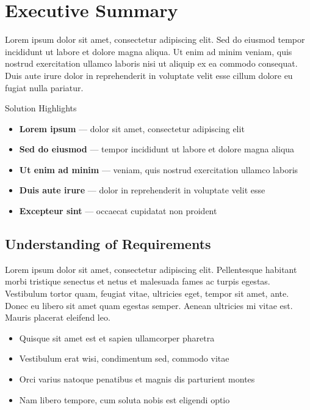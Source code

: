 \section{\texorpdfstring{\color{MidnightBlue}Executive Summary}{Executive Summary}}

Lorem ipsum dolor sit amet, consectetur adipiscing elit. Sed do eiusmod tempor incididunt ut labore et dolore magna aliqua. Ut enim ad minim veniam, quis nostrud exercitation ullamco laboris nisi ut aliquip ex ea commodo consequat. Duis aute irure dolor in reprehenderit in voluptate velit esse cillum dolore eu fugiat nulla pariatur.

\begin{sidebar}{Solution Highlights}
\begin{itemize}
    \item \textbf{Lorem ipsum} --- dolor sit amet, consectetur adipiscing elit
    \item \textbf{Sed do eiusmod} --- tempor incididunt ut labore et dolore magna aliqua
    \item \textbf{Ut enim ad minim} --- veniam, quis nostrud exercitation ullamco laboris
    \item \textbf{Duis aute irure} --- dolor in reprehenderit in voluptate velit esse
    \item \textbf{Excepteur sint} --- occaecat cupidatat non proident
\end{itemize}
\end{sidebar}

\subsection{Understanding of Requirements}

Lorem ipsum dolor sit amet, consectetur adipiscing elit. Pellentesque habitant morbi tristique senectus et netus et malesuada fames ac turpis egestas. Vestibulum tortor quam, feugiat vitae, ultricies eget, tempor sit amet, ante. Donec eu libero sit amet quam egestas semper. Aenean ultricies mi vitae est. Mauris placerat eleifend leo.

\begin{itemize}
    \item \textbf{} Quisque sit amet est et sapien ullamcorper pharetra
    \item \textbf{} Vestibulum erat wisi, condimentum sed, commodo vitae
    \item \textbf{} Orci varius natoque penatibus et magnis dis parturient montes
    \item \textbf{} Nam libero tempore, cum soluta nobis est eligendi optio
\end{itemize}


